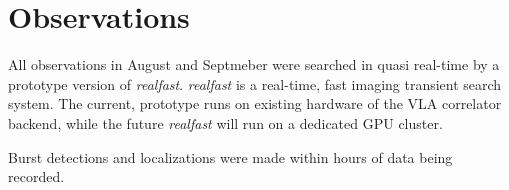 \section{Observations}

All observations in August and Septmeber were searched in quasi real-time by a prototype version of \emph{realfast}. \emph{realfast} is a real-time, fast imaging transient search system. The current, prototype runs on existing hardware of the VLA correlator backend, while the future \emph{realfast} will run on a dedicated GPU cluster.

Burst detections and localizations were made within hours of data being recorded.